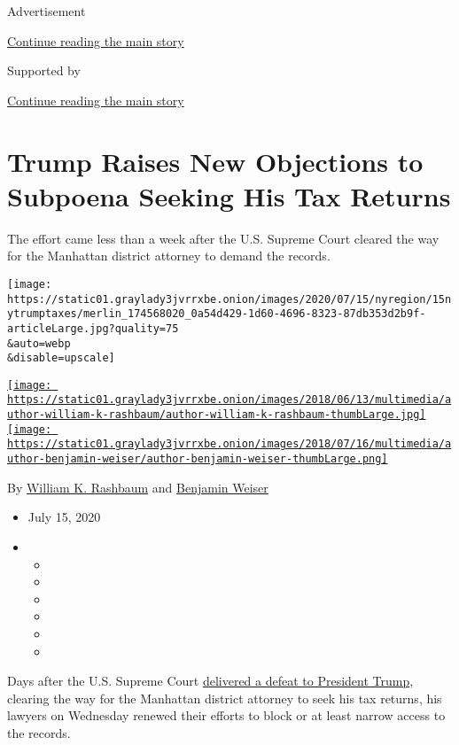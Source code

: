 Advertisement

\protect\hyperlink{after-top}{Continue reading the main story}

Supported by

\protect\hyperlink{after-sponsor}{Continue reading the main story}

\hypertarget{trump-raises-new-objections-to-subpoena-seeking-his-tax-returns}{%
\section{Trump Raises New Objections to Subpoena Seeking His Tax
Returns}\label{trump-raises-new-objections-to-subpoena-seeking-his-tax-returns}}

The effort came less than a week after the U.S. Supreme Court cleared
the way for the Manhattan district attorney to demand the records.

\texttt{[image: https://static01.graylady3jvrrxbe.onion/images/2020/07/15/nyregion/15nytrumptaxes/merlin\_174568020\_0a54d429-1d60-4696-8323-87db353d2b9f-articleLarge.jpg?quality=75\\\&auto=webp\\\&disable=upscale]}

\href{https://www.nytimes3xbfgragh.onion/by/william-k-rashbaum}{\texttt{[image: https://static01.graylady3jvrrxbe.onion/images/2018/06/13/multimedia/author-william-k-rashbaum/author-william-k-rashbaum-thumbLarge.jpg]}}\href{https://www.nytimes3xbfgragh.onion/by/benjamin-weiser}{\texttt{[image: https://static01.graylady3jvrrxbe.onion/images/2018/07/16/multimedia/author-benjamin-weiser/author-benjamin-weiser-thumbLarge.png]}}

By
\href{https://www.nytimes3xbfgragh.onion/by/william-k-rashbaum}{William
K. Rashbaum} and
\href{https://www.nytimes3xbfgragh.onion/by/benjamin-weiser}{Benjamin
Weiser}

\begin{itemize}
\item
  July 15, 2020
\item
  \begin{itemize}
  \item
  \item
  \item
  \item
  \item
  \item
  \end{itemize}
\end{itemize}

Days after the U.S. Supreme Court
\href{https://www.nytimes3xbfgragh.onion/2020/07/09/us/trump-taxes-supreme-court.html}{delivered
a defeat to President Trump}, clearing the way for the Manhattan
district attorney to seek his tax returns, his lawyers on Wednesday
renewed their efforts to block or at least narrow access to the records.

